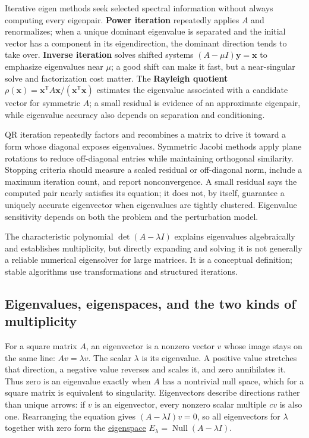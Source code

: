 Iterative eigen methods seek selected spectral information without always computing every eigenpair. \textbf{Power iteration} repeatedly applies \(A\) and renormalizes; when a unique dominant eigenvalue is separated and the initial vector has a component in its eigendirection, the dominant direction tends to take over. \textbf{Inverse iteration} solves shifted systems \((A-\mu I)\mathbf y=\mathbf x\) to emphasize eigenvalues near \(\mu\); a good shift can make it fast, but a near-singular solve and factorization cost matter. The \textbf{Rayleigh quotient} \(\rho(\mathbf x)=\mathbf x^\mathsf T A\mathbf x/(\mathbf x^\mathsf T\mathbf x)\) estimates the eigenvalue associated with a candidate vector for symmetric \(A\); a small residual is evidence of an approximate eigenpair, while eigenvalue accuracy also depends on separation and conditioning.

QR iteration repeatedly factors and recombines a matrix to drive it toward a form whose diagonal exposes eigenvalues. Symmetric Jacobi methods apply plane rotations to reduce off-diagonal entries while maintaining orthogonal similarity. Stopping criteria should measure a scaled residual or off-diagonal norm, include a maximum iteration count, and report nonconvergence. A small residual says the computed pair nearly satisfies its equation; it does not, by itself, guarantee a uniquely accurate eigenvector when eigenvalues are tightly clustered. Eigenvalue sensitivity depends on both the problem and the perturbation model.

The characteristic polynomial \(\det(A-\lambda I)\) explains eigenvalues algebraically and establishes multiplicity, but directly expanding and solving it is not generally a reliable numerical eigensolver for large matrices. It is a conceptual definition; stable algorithms use transformations and structured iterations.

\subsection{Eigenvalues, eigenspaces, and the two kinds of multiplicity}\label{01-foundations-i-ch020-eigenvalues-eigenspaces-and-the-two-kinds-of-multiplicity}

For a square matrix \(A\), an eigenvector is a nonzero vector \(v\) whose image stays on the same line: \(Av=\lambda v\). The scalar \(\lambda\) is its eigenvalue. A positive value stretches that direction, a negative value reverses and scales it, and zero annihilates it. Thus zero is an eigenvalue exactly when \(A\) has a nontrivial null space, which for a square matrix is equivalent to singularity. Eigenvectors describe directions rather than unique arrows: if \(v\) is an eigenvector, every nonzero scalar multiple \(cv\) is also one. Rearranging the equation gives \((A-\lambda I)v=0\), so all eigenvectors for \(\lambda\) together with zero form the \hyperref[01-foundations-i-ch020-eigenvalues-eigenspaces-and-the-two-kinds-of-multiplicity]{eigenspace} \(E_\lambda=\operatorname{Null}(A-\lambda I)\).

